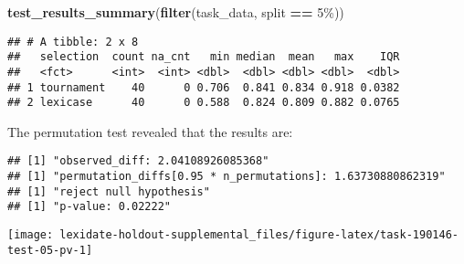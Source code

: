 \documentclass[
]{book}
\newenvironment{Shaded}{\begin{snugshade}}{\end{snugshade}}
\newcommand{\AttributeTok}[1]{\textcolor[rgb]{0.13,0.29,0.53}{#1}}
\newcommand{\DecValTok}[1]{\textcolor[rgb]{0.00,0.00,0.81}{#1}}
\newcommand{\FunctionTok}[1]{\textcolor[rgb]{0.13,0.29,0.53}{\textbf{#1}}}
\newcommand{\NormalTok}[1]{#1}
\newcommand{\OtherTok}[1]{\textcolor[rgb]{0.56,0.35,0.01}{#1}}
\newcommand{\SpecialCharTok}[1]{\textcolor[rgb]{0.81,0.36,0.00}{\textbf{#1}}}
\newcommand{\StringTok}[1]{\textcolor[rgb]{0.31,0.60,0.02}{#1}}
\begin{document}
\begin{Shaded}
\begin{Highlighting}[]
\FunctionTok{test\_results\_summary}\NormalTok{(}\FunctionTok{filter}\NormalTok{(task\_data, split }\SpecialCharTok{==} \StringTok{\textquotesingle{}5\%\textquotesingle{}}\NormalTok{))}
\end{Highlighting}
\end{Shaded}

\begin{verbatim}
## # A tibble: 2 x 8
##   selection  count na_cnt   min median  mean   max    IQR
##   <fct>      <int>  <int> <dbl>  <dbl> <dbl> <dbl>  <dbl>
## 1 tournament    40      0 0.706  0.841 0.834 0.918 0.0382
## 2 lexicase      40      0 0.588  0.824 0.809 0.882 0.0765
\end{verbatim}

The permutation test revealed that the results are:

\begin{Shaded}
\end{Shaded}

\begin{verbatim}
## [1] "observed_diff: 2.04108926085368"
## [1] "permutation_diffs[0.95 * n_permutations]: 1.63730880862319"
## [1] "reject null hypothesis"
## [1] "p-value: 0.02222"
\end{verbatim}

\texttt{[image: lexidate-holdout-supplemental\_files/figure-latex/task-190146-test-05-pv-1]}
\end{document}
